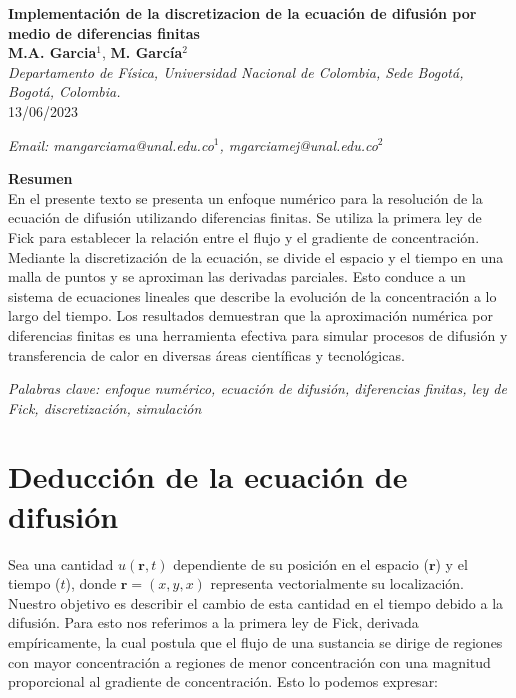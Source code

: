 \documentclass{article}
\author{J.P. Luengas^{1} , J.C. Aranda^{1}
}
\date{}
\begin{document}
 
     \begin{center}
        {\large\textbf{Implementación de la discretizacion de la ecuación de difusión por medio de diferencias finitas}}\\
        \vspace{5mm}
        {\small \textbf{M.A. Garcia$^{1}$}, \textbf{M. García}$^{2}$}\\
        \vspace{3mm}
        {\small \textit{Departamento de Física, Universidad Nacional de Colombia, Sede Bogotá, Bogotá, Colombia.}}\\
        \vspace{3mm}
        {\small 13/06/2023}
    \end{center}
    {\small \textit {Email: mangarciama@unal.edu.co$^{1}$, mgarciamej@unal.edu.co$^2$}} \\
    
    \vspace{5mm}

{\large \textbf{Resumen}}\\
En el presente texto se presenta un enfoque numérico para la resolución de la ecuación de difusión utilizando diferencias finitas. Se utiliza la primera ley de Fick para establecer la relación entre el flujo y el gradiente de concentración. Mediante la discretización de la ecuación, se divide el espacio y el tiempo en una malla de puntos y se aproximan las derivadas parciales. Esto conduce a un sistema de ecuaciones lineales que describe la evolución de la concentración a lo largo del tiempo. Los resultados demuestran que la aproximación numérica por diferencias finitas es una herramienta efectiva para simular procesos de difusión y transferencia de calor en diversas áreas científicas y tecnológicas.

 \textit{Palabras clave: enfoque numérico, ecuación de difusión, diferencias finitas, ley de Fick, discretización, simulación \hspace{2mm}}

\section{Deducción de la ecuación de difusión}
Sea una cantidad $u(\textbf{r},t)$ dependiente de su posición en el espacio ($\textbf{r}$) y el tiempo ($t$), donde $\textbf{r} = (x,y,x)$ representa vectorialmente su localización. Nuestro objetivo es describir el cambio de esta cantidad en el tiempo debido a la difusión. Para esto nos referimos a la primera ley de Fick, derivada empíricamente, la cual postula que el flujo de una sustancia se dirige de regiones con mayor concentración a regiones de menor concentración con una magnitud proporcional al gradiente de concentración. Esto lo podemos expresar:
\end{document}
